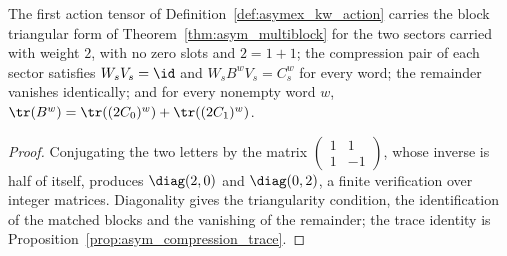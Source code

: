 \begin{theorem}
    \label{thm:asymex_kw_plus}
    \leanok
    The first action tensor of Definition~\ref{def:asymex_kw_action} carries
    the block triangular form of Theorem~\ref{thm:asym_multiblock} for the
    two sectors carried with weight $2$, with no zero slots and $2=1+1$;
    the compression pair of each sector satisfies $W_sV_s=\id$ and
    $W_sB^wV_s=C_s^w$ for every word; the remainder vanishes identically;
    and for every nonempty word $w$,
    $\tr(B^w)=\tr((2C_0)^w)+\tr((2C_1)^w)$.
\end{theorem}

\begin{proof}
    \leanok
    Conjugating the two letters by the matrix
    $\begin{pmatrix}1&1\\1&-1\end{pmatrix}$, whose inverse is half of
    itself, produces $\diag(2,0)$ and $\diag(0,2)$, a finite verification
    over integer matrices. Diagonality gives the triangularity condition,
    the identification of the matched blocks and the vanishing of the
    remainder; the trace identity is
    Proposition~\ref{prop:asym_compression_trace}.
\end{proof}

